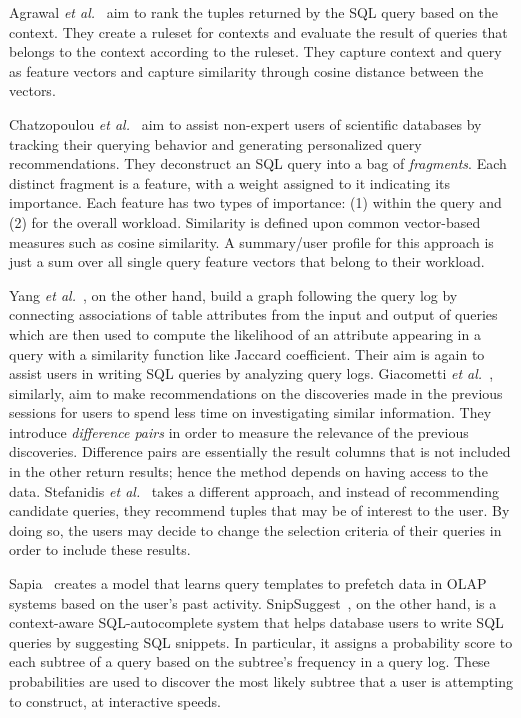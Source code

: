 Agrawal \textit{et al.}~\cite{agrawal2006context} aim to rank the tuples returned by the SQL query based on the context.
They create a ruleset for contexts and evaluate the result of queries that belongs to the context according to the ruleset.
They capture context and query as feature vectors and capture similarity through cosine distance between the vectors.

Chatzopoulou \textit{et al.}~\cite{chatzopoulou2011querie} aim to assist non-expert users of scientific databases by tracking their querying behavior and generating personalized query recommendations.
They deconstruct an SQL query into a bag of \textit{fragments}.
Each distinct fragment is a feature, with a weight assigned to it indicating its importance.
Each feature has two types of importance: (1) within the query and (2) for the overall workload.
Similarity is defined upon common vector-based measures such as cosine similarity.
A summary/user profile for this approach is just a sum over all single query feature vectors that belong to their workload.

Yang \textit{et al.}~\cite{yang2009}, on the other hand, build a graph following
the query log by connecting associations of table attributes from the input and output of queries which are then used to compute the likelihood of an attribute appearing in a query with a similarity function like Jaccard coefficient.
Their aim is again to assist users in writing SQL queries by analyzing query logs. Giacometti \textit{et al.}~\cite{giacometti2009}, similarly, aim to make recommendations on the discoveries made in the previous sessions for users to spend less time on investigating similar information.
They introduce \textit{difference pairs} in order to measure the relevance of the previous discoveries.
Difference pairs are essentially the result columns that is not included in the other return results; hence the method depends on having access to the data.
Stefanidis \textit{et al.}~\cite{stefanidis2009you} takes a different approach, and instead of recommending candidate queries, they recommend tuples that may be of interest to the user.
By doing so, the users may decide to change the selection criteria of their queries in order to include these results.

Sapia~\cite{Sapia:2000:PPQ:646109.679288} creates a model that learns query templates to prefetch data in OLAP systems based on the user's past activity. SnipSuggest~\cite{magda2010snipsuggest}, on the other hand, is a context-aware SQL-autocomplete system that helps database users to write SQL queries by suggesting SQL snippets.
In particular, it assigns a probability score to each subtree of a query based on the subtree's frequency in a query log.
These probabilities are used to discover the most likely subtree that a user is attempting to construct, at interactive speeds.

